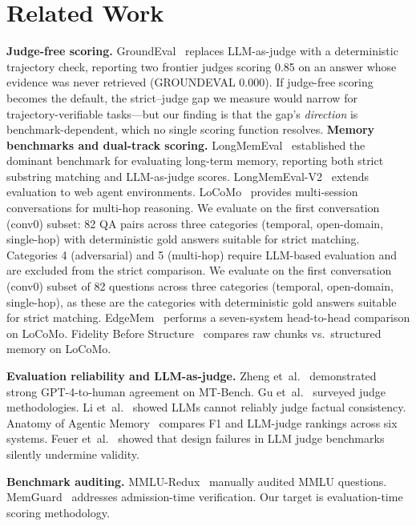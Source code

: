 \documentclass[10pt]{article}
\begin{document}
\section{Related Work}
\textbf{Judge-free scoring.} GroundEval~\cite{groundeval} replaces LLM-as-judge with a deterministic
trajectory check, reporting two frontier judges scoring 0.85 on an answer whose evidence was never
retrieved (GROUNDEVAL 0.000). If judge-free scoring becomes the default, the strict--judge gap we
measure would narrow for trajectory-verifiable tasks---but our finding is that the gap's
\emph{direction} is benchmark-dependent, which no single scoring function resolves.
\textbf{Memory benchmarks and dual-track scoring.} LongMemEval~\citep{wu2024longmemeval} established the dominant benchmark for evaluating long-term memory, reporting both strict substring matching and LLM-as-judge scores. LongMemEval-V2~\citep{longmemevalv2} extends evaluation to web agent environments. LoCoMo~\citep{locomo2024} provides multi-session conversations for multi-hop reasoning. We evaluate on the first conversation (conv0) subset: 82 QA pairs across three categories (temporal, open-domain, single-hop) with deterministic gold answers suitable for strict matching. Categories 4 (adversarial) and 5 (multi-hop) require LLM-based evaluation and are excluded from the strict comparison. We evaluate on the first conversation (conv0) subset of 82 questions across three categories (temporal, open-domain, single-hop), as these are the categories with deterministic gold answers suitable for strict matching. EdgeMem~\citep{edgemem2025} performs a seven-system head-to-head comparison on LoCoMo. Fidelity Before Structure~\citep{fidelity2026} compares raw chunks vs.\ structured memory on LoCoMo.

\textbf{Evaluation reliability and LLM-as-judge.} Zheng et~al.~\citep{zheng2023judge} demonstrated strong GPT-4-to-human agreement on MT-Bench. Gu et~al.~\citep{gu2024judgesurvey} surveyed judge methodologies. Li et~al.~\citep{li2025unreliable} showed LLMs cannot reliably judge factual consistency. Anatomy of Agentic Memory~\citep{anatomy2026} compares F1 and LLM-judge rankings across six systems. Feuer et~al.~\citep{feuer2025noise} showed that design failures in LLM judge benchmarks silently undermine validity.

\textbf{Benchmark auditing.} MMLU-Redux~\citep{mmluredux2024} manually audited MMLU questions. MemGuard~\citep{memguard2026} addresses admission-time verification. Our target is evaluation-time scoring methodology.
\end{document}
